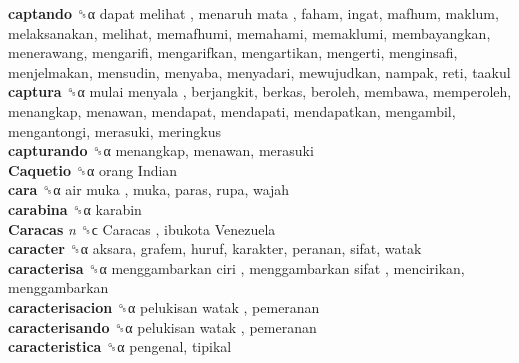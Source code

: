 \textbf{captando} ␝α   dapat melihat ,  menaruh mata , faham, ingat, mafhum, maklum, melaksanakan, melihat, memafhumi, memahami, memaklumi, membayangkan, menerawang, mengarifi, mengarifkan, mengartikan, mengerti, menginsafi, menjelmakan, mensudin, menyaba, menyadari, mewujudkan, nampak, reti, taakul  \\
\textbf{captura} ␝α   mulai menyala , berjangkit, berkas, beroleh, membawa, memperoleh, menangkap, menawan, mendapat, mendapati, mendapatkan, mengambil, mengantongi, merasuki, meringkus  \\
\textbf{capturando} ␝α  menangkap, menawan, merasuki  \\
\textbf{Caquetio} ␝α   orang Indian   \\
\textbf{cara} ␝α   air muka , muka, paras, rupa, wajah  \\
\textbf{carabina} ␝α  karabin  \\
\textbf{Caracas} \emph{n}  ␝ϲ   Caracas ,  ibukota Venezuela   \\
\textbf{caracter} ␝α  aksara, grafem, huruf, karakter, peranan, sifat, watak  \\
\textbf{caracterisa} ␝α   menggambarkan ciri ,  menggambarkan sifat , mencirikan, menggambarkan  \\
\textbf{caracterisacion} ␝α   pelukisan watak , pemeranan  \\
\textbf{caracterisando} ␝α   pelukisan watak , pemeranan  \\
\textbf{caracteristica} ␝α  pengenal, tipikal  \\
